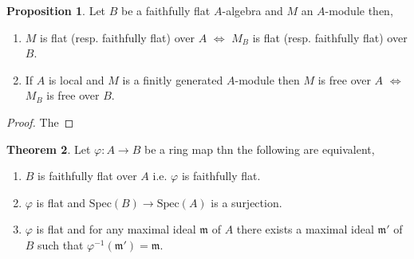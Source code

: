 \documentclass[12pt]{article}
\newcommand{\spec}[1]{\mathrm{Spec}\left( #1 \right)}
\newcommand{\m}{\mathfrak{m}}
\theoremstyle{remark}
\theoremstyle{definition}
\newtheorem{theorem}{Theorem}[section]
\newtheorem{proposition}[theorem]{Proposition}
\begin{document}
\begin{proposition}
Let $B$ be a faithfully flat $A$-algebra and $M$ an $A$-module then,
\begin{enumerate}
\item $M$ is flat (resp. faithfully flat) over $A$ $\iff$ $M_B$ is flat (resp. faithfully flat) over $B$.
\item If $A$ is local and $M$ is a finitly generated $A$-module then $M$ is free over $A$ $\iff$ $M_B$ is free over $B$.   
\end{enumerate}
\end{proposition}

\begin{proof}
The 
\end{proof}

\begin{theorem}
Let $\varphi : A \to B$ be a ring map thn the following are equivalent,
\begin{enumerate}
\item $B$ is faithfully flat over $A$ i.e. $\varphi$ is faithfully flat.

\item $\varphi$ is flat and $\spec{B} \to \spec{A}$ is a surjection.

\item $\varphi$ is flat and for any maximal ideal $\m$ of $A$ there exists a maximal ideal $\m'$ of $B$ such that $\varphi^{-1}(\m') = \m$.
\end{enumerate}
\end{theorem}
\end{document}

